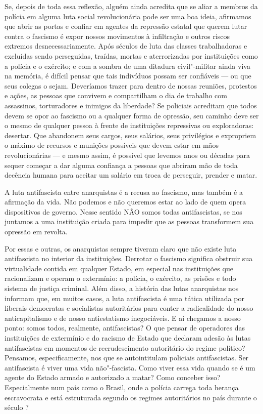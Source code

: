 Se, depois de toda essa reflexão, alguém ainda acredita que se aliar a membros da polícia em alguma luta social revolucionária pode ser uma boa ideia, afirmamos que abrir as portas e confiar em agentes da repressão estatal que querem lutar contra o fascismo é expor nossos movimentos à infiltração e outros riscos extremos desnecessariamente. Após séculos de luta das classes trabalhadoras e excluídas sendo perseguidas, traídas, mortas e aterrorizadas por instituições como a polícia e o exército; e com a sombra de uma ditadura civil"-militar ainda viva na memória, é difícil pensar que tais indivíduos possam ser confiáveis --- ou que seus colegas o sejam. Deveríamos trazer para dentro de nossas reuniões, protestos e ações, as pessoas que convivem e compartilham o dia de trabalho com assassinos, torturadores e inimigos da liberdade? Se policiais acreditam que todos devem se opor ao fascismo ou a qualquer forma de opressão, seu caminho deve ser o mesmo de qualquer pessoa à frente de instituições repressivas ou exploradoras: desertar. Que abandonem seus cargos, seus salários, seus privilégios e expropriem o máximo de recursos e munições possíveis que devem estar em mãos revolucionárias --- e mesmo assim, é possível que levemos anos ou décadas para sequer começar a dar alguma confiança a pessoas que abriram mão de toda decência humana para aceitar um salário em troca de perseguir, prender e matar.

A luta antifascista entre anarquistas é a recusa ao fascismo, mas também é a afirmação da vida. Não podemos e não queremos estar ao lado de quem opera dispositivos de governo. Nesse sentido NÃO somos todas antifascistas, se nos juntamos a uma instituição criada para impedir que as pessoas transformem sua opressão em revolta.

Por essas e outras, os anarquistas sempre tiveram claro que não existe luta antifascista no interior da instituições. Derrotar o fascismo significa obstruir sua virtualidade contida em qualquer Estado, em especial nas instituições que racionalizam e operam o extermínio: a polícia, o exército, as prisões e todo sistema de justiça criminal. Além disso, a história das lutas anarquistas nos informam que, em muitos casos, a luta antifascista é uma tática utilizada por liberais democratas e socialistas autoritários para conter a radicalidade do nosso anticapitalismo e de nosso antiestatismo inegociáveis. E aí chegamos a nosso ponto: somos todos, realmente, antifascistas? O que pensar de operadores das instituições de extermínio e do racismo de Estado que declaram adesão às lutas antifascistas em momentos de recrudescimento autoritário do regime político? Pensamos, especificamente, nos que se autointitulam policiais antifascistas. Ser antifascista é viver uma vida não"-fascista. Como viver essa vida quando se é um agente do Estado armado e autorizado a matar? Como conceber isso? Especialmente num país como o Brasil, onde a polícia carrega toda herança escravocrata e está estruturada segundo os regimes autoritários no país durante o século ?

